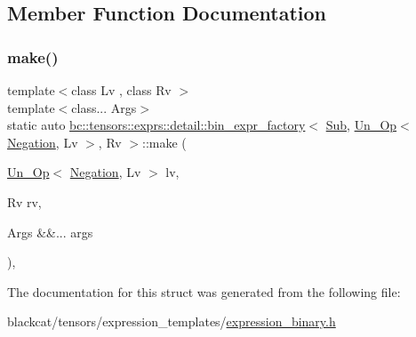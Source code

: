 \subsection{Member Function Documentation}
\mbox{\label{structbc_1_1tensors_1_1exprs_1_1detail_1_1bin__expr__factory_3_01Sub_00_01Un__Op_3_01Negation_00_01Lv_01_4_00_01Rv_01_4_aaf27f4570867ee57ce9f2ef8c6e11170}} 
\subsubsection{\texorpdfstring{make()}{make()}}
{\footnotesize\ttfamily template$<$class Lv , class Rv $>$ \\
template$<$class... Args$>$ \\
static auto \hyperlink{structbc_1_1tensors_1_1exprs_1_1detail_1_1bin__expr__factory}{bc\+::tensors\+::exprs\+::detail\+::bin\+\_\+expr\+\_\+factory}$<$ \hyperlink{structbc_1_1oper_1_1Sub}{Sub}, \hyperlink{structbc_1_1tensors_1_1exprs_1_1Un__Op}{Un\+\_\+\+Op}$<$ \hyperlink{structbc_1_1oper_1_1Negation}{Negation}, Lv $>$, Rv $>$\+::make (\begin{DoxyParamCaption}\item[{\hyperlink{structbc_1_1tensors_1_1exprs_1_1Un__Op}{Un\+\_\+\+Op}$<$ \hyperlink{structbc_1_1oper_1_1Negation}{Negation}, Lv $>$}]{lv,  }\item[{Rv}]{rv,  }\item[{Args \&\&...}]{args }\end{DoxyParamCaption})\hspace{0.3cm}{\ttfamily [inline]}, {\ttfamily [static]}}



The documentation for this struct was generated from the following file\+:\begin{DoxyCompactItemize}
\item 
blackcat/tensors/expression\+\_\+templates/\hyperlink{expression__binary_8h}{expression\+\_\+binary.\+h}\end{DoxyCompactItemize}
